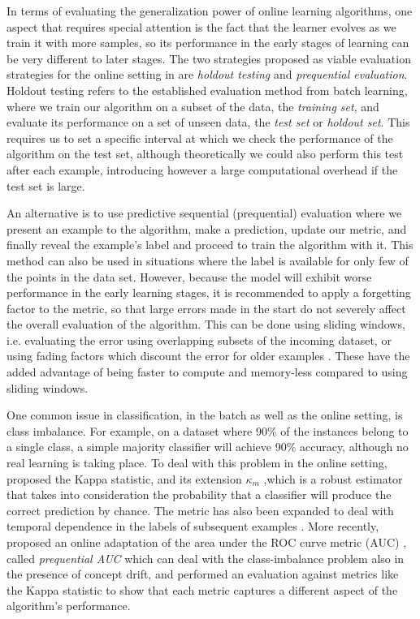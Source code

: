 In terms of evaluating the generalization power of online learning
algorithms, one aspect that requires special attention is the fact
that the learner evolves as we train it with more samples, so its
performance in the early stages of learning can be very different
to later stages. The two strategies proposed as viable evaluation strategies for the online
setting in \cite{online-evaluation-journal} are \emph{holdout testing}
and \emph{prequential evaluation}. Holdout testing refers to the
established evaluation method from batch learning, where we train
our algorithm on a subset of the data, the \emph{training set},
and evaluate its performance on a set of unseen data, the
\emph{test set} or \emph{holdout set}. This requires us to set a
specific interval at which we check the performance of the algorithm
on the test set, although theoretically we could also perform this
test after each example, introducing however a large computational overhead if
the test set is large.

An alternative is to use
predictive sequential (prequential) evaluation where we present
an example to the algorithm, make a prediction, update our metric,
and finally reveal the example's label and proceed to train the
algorithm with it. This method can also be used in situations
where the label is available for only few of the points in the
data set. However, because the model will exhibit worse performance
in the early learning stages, it is recommended to apply a forgetting
factor to the metric, so that large errors made in the start do
not severely affect the overall evaluation of the algorithm. This
can be done using sliding windows, i.e. evaluating the error using
overlapping subsets of the incoming dataset, or using fading
factors which discount the error for older examples \cite{online-evaluation-kdd}.
These have the added advantage of being faster to compute and memory-less
compared to using sliding windows.

One common issue in classification, in the batch as well as the online setting, is class
imbalance.
For example, on a dataset where 90\% of the instances belong to a single
class, a simple majority classifier will achieve 90\% accuracy, although no
real learning is taking place.
To deal with this problem in the online setting, \citet{kappa-statistic}
proposed the Kappa statistic, and its extension $\kappa_m$ \cite{kappa-m},which is a robust estimator that takes into consideration
the probability that a classifier will produce the correct prediction by chance.
The metric has also been expanded to deal with temporal dependence
in the labels of subsequent examples \cite{temporal-dependence}.
More recently, \citet{prequential-auc} proposed an online adaptation
of the area under the ROC curve metric (AUC) \cite{auc}, called
\emph{prequential AUC} which can deal with the class-imbalance
problem also in the presence of concept drift, and performed
an evaluation against metrics like the Kappa statistic to show
that each metric captures a different aspect of the algorithm's performance.

